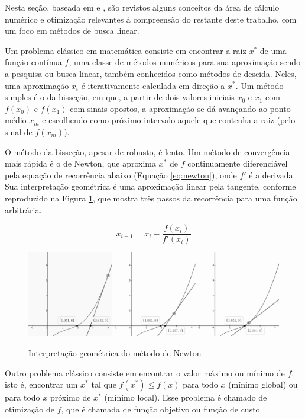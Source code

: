 \documentclass[cic,tc]{iiufrgs}
\begin{document}
Nesta seção, baseada em \cite{stewart1991calculus} e
\cite{nocedal2006numerical}, são revistos alguns conceitos da área de cálculo
numérico e otimização relevantes à compreensão do restante deste trabalho, com
um foco em métodos de busca linear.

Um problema clássico em matemática consiste em encontrar a raiz $x^*$ de uma
função contínua $f$, uma classe de métodos numéricos para sua aproximação sendo
a pesquisa ou busca linear, também conhecidos como métodos de descida. Neles,
uma aproximação $x_i$ é iterativamente calculada em direção a $x^*$. Um método
simples é o da bisseção, em que, a partir de dois valores iniciais $x_0$ e
$x_1$ com $f(x_0)$ e $f(x_1)$ com sinais opostos, a aproximação se dá avançando
ao ponto médio $x_m$ e escolhendo como próximo intervalo aquele que contenha a
raiz (pelo sinal de $f(x_m)$).

O método da bisseção, apesar de robusto, é lento. Um método de convergência
mais rápida é o de Newton, que aproxima $x^*$ de $f$ continuamente diferenciável
pela equação de recorrência abaixo (Equação \ref{eq:newton}), onde $f'$ é a
derivada. Sua interpretação geométrica é uma aproximação linear pela tangente,
conforme reproduzido na Figura \ref{fig:tan}, que mostra três passos da
recorrência para uma função arbitrária.

\begin{equation}
\label{eq:newton}
x_{i + 1} = x_i - \frac{f(x_i)}{f'(x_i)}
\end{equation}

\begin{figure} \caption{Interpretação geométrica do método de Newton} \begin{center}
\includegraphics[width=0.8\linewidth]{img/tan.png} \end{center}
 \label{fig:tan} \end{figure}

Outro problema clássico consiste em encontrar o valor máximo ou mínimo de $f$,
isto é, encontrar um $x^*$ tal que $f(x^*) \le f(x)$ para todo $x$ (mínimo
global) ou para todo $x$ próximo de $x^*$ (mínimo local). Esse problema é
chamado de otimização de $f$, que é chamada de função objetivo ou função de
custo.
\end{document}
